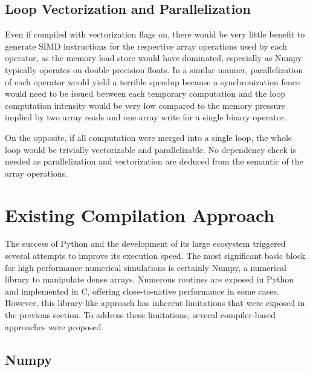 \documentclass[10pt, preprint]{sigplanconf}
\begin{document}
\subsection{Loop Vectorization and Parallelization}

Even if compiled with vectorization flags on, there would be very little
benefit to generate SIMD instructions for the respective array operations used
by each operator, as the memory load store would have dominated, especially as
Numpy typically operates on double precision floats. In a similar manner,
parallelization of each operator would yield a terrible speedup because a
synchronization fence would need to be issued between each temporary
computation and the loop computation intensity would be very low compared to
the memory pressure implied by two array reads and one array write for a single
binary operator.

On the opposite, if all computation were merged into a single loop, the whole
loop would be trivially vectorizable and parallelizable.
No dependency check is needed as parallelization and vectorization are deduced
from the semantic of the array operations.

\section{Existing Compilation Approach}
\label{sec:compilers}

The success of Python and the development of its large ecosystem triggered
several attempts to improve its execution speed. The most significant basic
block for high performance numerical simulations is certainly Numpy, a
numerical library to manipulate dense arrays. Numerous routines are exposed in
Python and implemented in C, offering close-to-native performance in some cases.
%
However, this library-like approach has inherent limitations that were exposed
in the previous section. To address these limitations, several compiler-based
approaches were proposed.

\subsection{Numpy}
\cite{oliphant2007,numpyarray2011}
\end{document}
